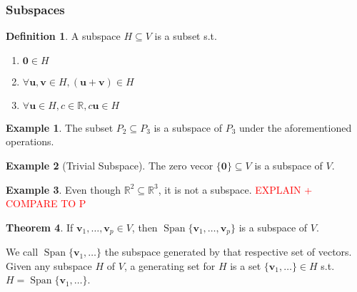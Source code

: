\documentclass{article}
\numberwithin{equation}{section}
\theoremstyle{definition}
\newtheorem{thm}{Theorem}[subsection]
\newtheorem{defn}{Definition}[subsection]
\newtheorem{ex}[thm]{Example}
\newcommand{\V}{\mathbf{v}}
\newcommand{\U}{\mathbf{u}}
\newcommand{\R}{\mathbb{R}}
\DeclareMathOperator{\spa}{Span}
\let\oldforall\forall
\renewcommand{\forall}{\mathrel{\oldforall}}
\theoremstyle{adefn}
\begin{document}
	\subsubsection{Subspaces}
	\begin{defn}
		A subspace $H \subseteq V$ is a subset s.t. 
		\begin{enumerate}
			\item $\textbf{0} \in H$
			\item $\forall \U, \V \in H, (\U + \V) \in H$
			\item $\forall \U \in H, c \in \R, c\U \in H$
		\end{enumerate}
	\end{defn}
	\begin{ex}
		The subset $P_2 \subseteq P_3$ is a subspace of $P_3$ under the aforementioned operations. 
	\end{ex}
	\begin{ex}[Trivial Subspace]
		The zero vecor $\{\textbf{0}\} \subseteq V$ is a subspace of $V$. 
	\end{ex}
	\begin{ex}
		Even though $\R^2 \subseteq \R^3$, it is not a subspace. \textcolor{red}{EXPLAIN + COMPARE TO P}
	\end{ex}
	\begin{thm}
		If $\textbf{v}_1, \ldots, \textbf{v}_p \in V$, then $\spa\{\textbf{v}_1, \ldots, \textbf{v}_p\}$ is a subspace of $V$. 
	\end{thm}
	We call $\spa\{\textbf{v}_1,\ldots \}$ the subspace generated by that respective set of vectors. Given any subspace $H$ of $V$, a generating set for $H$ is a set $\{\textbf{v}_1,\ldots\} \in H$ s.t. $H = \spa\{\textbf{v}_1,\ldots\}$. 
\end{document}

